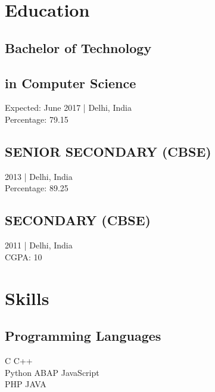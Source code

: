 \documentclass[]{resume-openfont}
\begin{document}
%
%



%
%

\begin{minipage}[t]{0.33\textwidth} 


\section{Education} 

\subsection{Bachelor of Technology} \subsection{in Computer Science}
Expected: June 2017 | Delhi, India \\ Percentage: 79.15
\sectionsep

\subsection{SENIOR SECONDARY (CBSE)}
2013 | Delhi, India \\ Percentage: 89.25
\sectionsep

\subsection{SECONDARY (CBSE)}
2011 | Delhi, India \\ CGPA: 10
\sectionsep


\section{Skills}
\subsection{Programming Languages}
C \textbullet{} C++ \\
Python \textbullet{} ABAP \textbullet{} JavaScript\\
PHP \textbullet{} JAVA \\
\sectionsep

\end{minipage}
\end{document}
